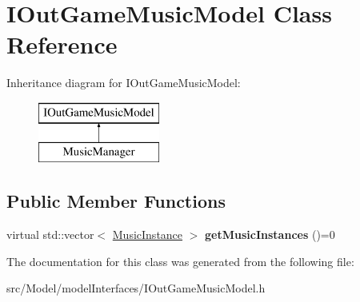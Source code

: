 \hypertarget{classIOutGameMusicModel}{}\section{I\+Out\+Game\+Music\+Model Class Reference}
\label{classIOutGameMusicModel}
Inheritance diagram for I\+Out\+Game\+Music\+Model\+:\begin{figure}[H]
\begin{center}
\leavevmode
\includegraphics[height=2.000000cm]{classIOutGameMusicModel}
\end{center}
\end{figure}
\subsection*{Public Member Functions}
\begin{DoxyCompactItemize}
\item 
virtual std\+::vector$<$ \hyperlink{classMusicInstance}{Music\+Instance} $>$ {\bfseries get\+Music\+Instances} ()=0\hypertarget{classIOutGameMusicModel_aa2517fa9ac017fce2fe36a9c416bcb42}{}\label{classIOutGameMusicModel_aa2517fa9ac017fce2fe36a9c416bcb42}

\end{DoxyCompactItemize}


The documentation for this class was generated from the following file\+:\begin{DoxyCompactItemize}
\item 
src/\+Model/model\+Interfaces/I\+Out\+Game\+Music\+Model.\+h\end{DoxyCompactItemize}
